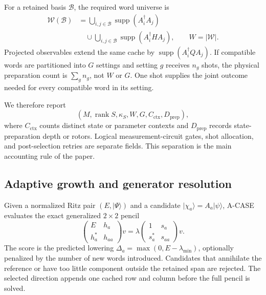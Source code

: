 \documentclass[aps,pra,reprint,superscriptaddress,nofootinbib,floatfix]{revtex4-2}
\newcommand{\ket}[1]{\lvert #1\rangle}
\newcommand{\supp}{\operatorname{supp}}
\newcommand{\rank}{\operatorname{rank}}
\begin{document}
For a retained basis \(\mathcal B\), the required word universe is
\begin{align}
 \mathcal W(\mathcal B)
 &=
 \bigcup_{i,j\in\mathcal B}\supp(A_i^\dagger A_j)
 \nonumber\\
 &\quad\cup
 \bigcup_{i,j\in\mathcal B}\supp(A_i^\dagger H A_j),
 \qquad W=|\mathcal W|.
 \label{eq:word-universe}
\end{align}
Projected observables extend the same cache by
\(\supp(A_i^\dagger Q A_j)\).  If compatible words are partitioned into
\(G\) settings and setting \(g\) receives \(n_g\) shots, the physical
preparation count is \(\sum_g n_g\), not \(W\) or \(G\).  One shot supplies
the joint outcome needed for every compatible word in its setting.

We therefore report
\begin{equation}
 (M,\rank S,\kappa_S,W,G,C_{\mathrm{ctx}},D_{\mathrm{prep}}),
 \label{eq:ledger}
\end{equation}
where \(C_{\mathrm{ctx}}\) counts distinct state or parameter contexts and
\(D_{\mathrm{prep}}\) records state-preparation depth or rotors.  Logical
measurement-circuit gates, shot allocation, and post-selection retries are
separate fields.  This separation is the main accounting rule of the paper.

\subsection{Adaptive growth and generator resolution}
\label{sec:growth}

Given a normalized Ritz pair \((E,\ket{\Psi})\) and a candidate
\(\ket{\chi_a}=A_a\ket{\psi}\), A-CASE evaluates the exact generalized
\(2\times2\) pencil
\begin{equation}
 \begin{pmatrix}E&h_a\\h_a^*&h_{aa}\end{pmatrix}v
 =\lambda
 \begin{pmatrix}1&s_a\\s_a^*&s_{aa}\end{pmatrix}v .
 \label{eq:two-by-two}
\end{equation}
The score is the predicted lowering
\(\Delta_a=\max(0,E-\lambda_{\min})\), optionally penalized by the number of
new words introduced.  Candidates that annihilate the reference or have too
little component outside the retained span are rejected.  The selected
direction appends one cached row and column before the full pencil is solved.
\end{document}
